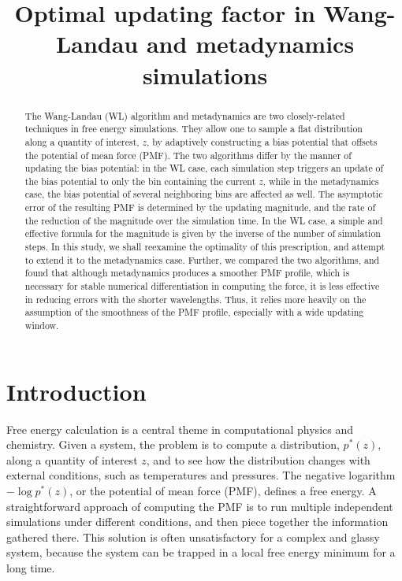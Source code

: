 \documentclass[reprint]{revtex4-1}
\begin{document}
\title{Optimal updating factor in Wang-Landau and metadynamics simulations}



\begin{abstract}
  The Wang-Landau (WL) algorithm and metadynamics
  are two closely-related techniques in free energy simulations.
  They allow one to sample a flat distribution
  along a quantity of interest, $z$,
  by adaptively constructing a bias potential
  that offsets the potential of mean force (PMF).
  The two algorithms differ by
  the manner of updating the bias potential:
  in the WL case, each simulation step triggers
  an update of the bias potential to only
  the bin containing the current $z$,
  while in the metadynamics case,
  the bias potential of several neighboring bins
  are affected as well.
  The asymptotic error of the resulting PMF
  is determined by the updating magnitude,
  and the rate of the reduction of the magnitude
  over the simulation time.
  In the WL case,
  a simple and effective formula for the magnitude
  is given by the inverse of the number of simulation steps.
  In this study, we shall reexamine the optimality of this prescription,
  and attempt to extend it to the metadynamics case.
  Further, we compared the two algorithms, and found that
  although metadynamics produces a smoother PMF profile,
  which is necessary for stable numerical differentiation
  in computing the force,
  it is less effective in reducing errors with the shorter wavelengths.
  Thus, it relies more heavily on the assumption of
  the smoothness of the PMF profile,
  especially with a wide updating window.
\end{abstract}

\maketitle



\section{Introduction}



Free energy calculation\cite{frenkel} is a central theme
in computational physics and chemistry.
%
Given a system,
the problem is to compute a distribution, $p^*(z)$,
along a quantity of interest $z$, and to see how
the distribution changes with external conditions,
such as temperatures and pressures.
%
The negative logarithm $-\log p^*(z)$,
or the potential of mean force (PMF),
defines a free energy.
%
A straightforward approach of computing the PMF
is to run multiple independent simulations
under different conditions,
and then piece together the information
gathered there.
%
This solution is often unsatisfactory
for a complex and glassy system,
because the system can be trapped
in a local free energy minimum
for a long time.
\end{document}
